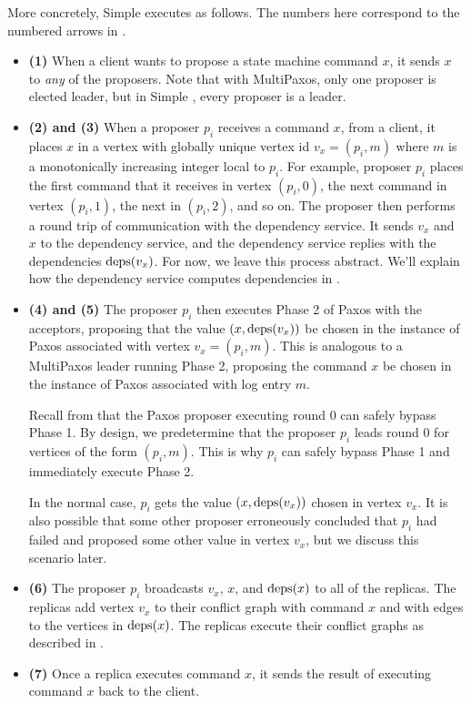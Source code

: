 More concretely, Simple \BPaxos{} executes as follows. The numbers here
correspond to the numbered arrows in .
\begin{itemize}
  \item \textbf{(1)}
    When a client wants to propose a state machine command $x$, it sends $x$ to
    \emph{any} of the proposers. Note that with MultiPaxos, only one proposer
    is elected leader, but in Simple \BPaxos{}, every proposer is a leader.

  \item \textbf{(2) and (3)}
    When a proposer $p_i$ receives a command $x$, from a client, it places $x$
    in a vertex with globally unique vertex id $v_x = (p_i, m)$ where $m$ is a
    monotonically increasing integer local to $p_i$. For example, proposer
    $p_i$ places the first command that it receives in vertex $(p_i, 0)$, the
    next command in vertex $(p_i, 1)$, the next in $(p_i, 2)$, and so on. The
    proposer then performs a round trip of communication with the dependency
    service. It sends $v_x$ and $x$ to the dependency service, and the
    dependency service replies with the dependencies $\text{deps}(v_x)$. For now, we
    leave this process abstract. We'll explain how the dependency service
    computes dependencies in .

  \item \textbf{(4) and (5)}
    The proposer $p_i$ then executes Phase 2 of Paxos with the acceptors,
    proposing that the value $(x, \text{deps}(v_x))$ be chosen in the instance of
    Paxos associated with vertex $v_x = (p_i, m)$. This is analogous to a
    MultiPaxos leader running Phase 2, proposing the command $x$ be chosen in
    the instance of Paxos associated with log entry $m$.

    Recall from  that the Paxos proposer executing round 0
    can safely bypass Phase 1. By design, we predetermine that the proposer
    $p_i$ leads round $0$ for vertices of the form $(p_i, m)$. This is why
    $p_i$ can safely bypass Phase 1 and immediately execute Phase 2.

    In the normal case, $p_i$ gets the value $(x, \text{deps}(v_x))$ chosen in vertex
    $v_x$. It is also possible that some other proposer erroneously concluded
    that $p_i$ had failed and proposed some other value in vertex $v_x$, but we
    discuss this scenario later.

  \item \textbf{(6)}
    The proposer $p_i$ broadcasts $v_x$, $x$, and $\text{deps}(x)$ to all of the
    replicas. The replicas add vertex $v_x$ to their conflict graph with
    command $x$ and with edges to the vertices in $\text{deps}(x)$. The replicas
    execute their conflict graphs as described in .

  \item \textbf{(7)}
    Once a replica executes command $x$, it sends the result of executing
    command $x$ back to the client.
\end{itemize}

